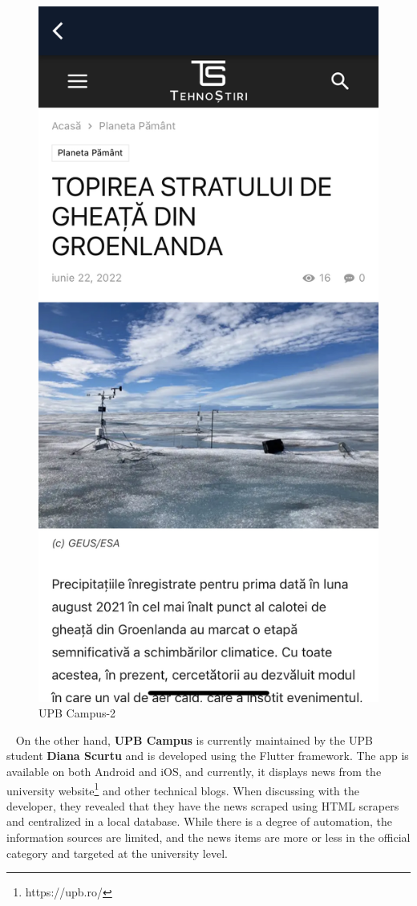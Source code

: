 \begin{figure}[!ht]
\begin{minipage}[b]{0.23\textwidth}
        \includegraphics[width=\textwidth]{figures/app/miscellanous/upb-campus-2.png}
        \caption{UPB Campus-2}
        \label{4:fig:upb-campus-2}
    \end{minipage}
\end{figure}

~
On the other hand, \textbf{UPB Campus} is currently maintained by the UPB student \textbf{Diana Scurtu} and is developed using the Flutter framework. The app is available on both Android and iOS, and currently, it displays news from the university website\footnote{https://upb.ro/} and other technical blogs. When discussing with the developer, they revealed that they have the news scraped using HTML scrapers and centralized in a local database. While there is a degree of automation, the information sources are limited, and the news items are more or less in the official category and targeted at the university level.
